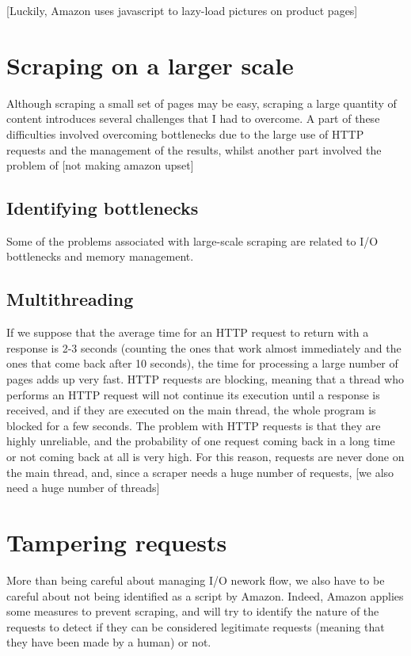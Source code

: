 \documentclass[LaM,binding=0.6cm]{sapthesis}
\begin{document}
[Luckily, Amazon uses javascript to lazy-load pictures on product pages]

\section{Scraping on a larger scale}

Although scraping a small set of pages may be easy, scraping a large quantity of content introduces several challenges that I had to overcome. A part of these difficulties involved overcoming bottlenecks due to the large use of HTTP requests and the management of the results, whilst another part involved the problem of [not making amazon upset]

\subsection{Identifying bottlenecks}

Some of the problems associated with large-scale scraping are related to I/O bottlenecks and memory management. 

\subsection{Multithreading}

If we suppose that the average time for an HTTP request to return with a response is 2-3 seconds (counting the ones that work almost immediately and the ones that come back after 10 seconds), the time for processing a large number of pages adds up very fast. HTTP requests are blocking, meaning that a thread who performs an HTTP request will not continue its execution until a response is received, and if they are executed on the main thread, the whole program is blocked for a few seconds. The problem with HTTP requests is that they are highly unreliable, and the probability of one request coming back in a long time or not coming back at all is very high. For this reason, requests are never done on the main thread, and, since a scraper needs a huge number of requests, [we also need a huge number of threads]

\section{Tampering requests}

More than being careful about managing I/O nework flow, we also have to be careful about not being identified as a script by Amazon. Indeed, Amazon applies some measures to prevent scraping, and will try to identify the nature of the requests to detect if they can be considered legitimate requests (meaning that they have been made by a human) or not. 
\end{document}
